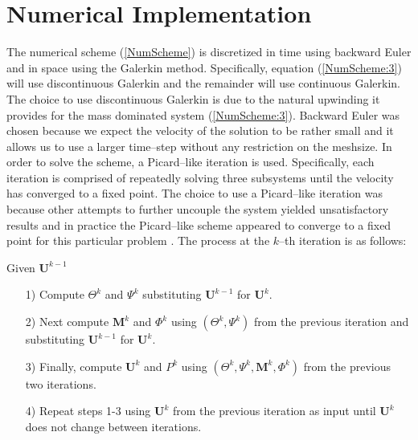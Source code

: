 \documentclass[11pt,fullpage]{article}
\theoremstyle{lemma}
\theoremstyle{definition}
\theoremstyle{lemma}
\begin{document}
\section{Numerical Implementation}
The numerical scheme (\ref{NumScheme}) is discretized in time using backward Euler and in space using the Galerkin method. Specifically, equation (\ref{NumScheme:3}) will use discontinuous Galerkin and the remainder will use continuous Galerkin. The choice to use discontinuous Galerkin is due to the natural upwinding it provides for the mass dominated system (\ref{NumScheme:3}). Backward Euler was chosen because we expect the velocity of the solution to be rather small and it allows us to use a larger time--step without any restriction on the meshsize. In order to solve the scheme, a Picard--like iteration is used. Specifically, each iteration is comprised of repeatedly solving three subsystems until the velocity has converged to a fixed point. The choice to use a Picard--like iteration was because other attempts to further uncouple the system yielded unsatisfactory results and in practice the Picard--like scheme appeared to converge to a fixed point for this particular problem \cite{DiffuseInterface}. The process at the $k$--th iteration is as follows: 

Given $\mathbf{U}^{k-1}$ 
\begin{itemize}
	\item[1)] Compute $\Theta^k$ and $\Psi^k$ substituting $\mathbf{U}^{k-1}$ for $\mathbf{U}^{k}$.
	
	\item[2)] Next compute $\mathbf{M}^k$ and $\Phi^k$ using $(\Theta^k,\Psi^k)$ from the previous iteration and substituting $\mathbf{U}^{k-1}$ for $\mathbf{U}^{k}$.
	
	\item[3)] Finally, compute $\mathbf{U}^k$ and $P^k$ using $(\Theta^k,\Psi^k, \mathbf{M}^k, \Phi^k)$ from the previous two iterations.
	
	\item[4)] Repeat steps 1-3 using $\mathbf{U}^k$ from the previous iteration as input until $\mathbf{U}^k$ does not change between iterations.
\end{itemize}
\end{document}
